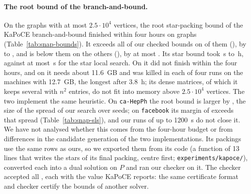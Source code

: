 \paragraph{The root bound of the branch-and-bound.}  On the graphs with at
most $2.5\cdot10^4$ vertices, the root star-packing bound of the KaPoCE
branch-and-bound finished within four hours on \numRootN{} graphs
(Table~\ref{tab:snap-bounds}).  It exceeds all of our checked bounds on
\numRootBetter{} of them (\numRootBetterList{}), by \numRootBetterLo{} to
\numRootBetterHi{}, and is below them on the others (\numRootBelowList{}),
by at most \numRootBelowMax{}.  Its star bound took \numRootTimeLo{}\,s to
\numRootTimeHi{}\,h, against at most \numSlsTimeMax{}\,s for the star local
search.  On \numRootTimeoutList{} it did not finish within the four hours,
and on \numRootMemList{} it needs about \SI{11.6}{GB} and was killed in each
of four runs on the machines with \SI{12.7}{GB}, the longest after
\SI{3.8}{h}; its dense matrices, of which it keeps several with $n^2$
entries, do not fit into memory above $2.5\cdot10^4$ vertices.  The two
implement the same heuristic.  On \texttt{ca-HepPh} the root bound is larger by
\numRootBetterLo{}, the size of the spread of our search over seeds; on
\texttt{facebook} its margin of \numRootBetterHi{} exceeds that spread
(Table~\ref{tab:snap-sls}), and our runs of up to \SI{1200}{s} do not close
it.  We have not analysed whether this comes from the four-hour budget or
from differences in the candidate generation of the two implementations.  Its
packings use the same rows as ours, so we exported them from its code (a
function of 13 lines that writes the stars of its final packing, centre
first; \texttt{experiments/kapoce/}), converted each into a dual solution on
$P$ and ran our checker on it.  The checker accepted all \numRootCert{}, each
with the value KaPoCE reports: the same certificate format and checker
certify the bounds of another solver.

